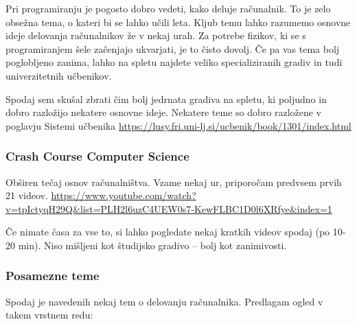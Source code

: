 \documentclass[
]{report}
\begin{document}
Pri programiranju je pogosto dobro vedeti, kako deluje računalnik. To je zelo obsežna tema, o kateri bi se lahko učili leta. Kljub temu lahko razumemo osnovne ideje delovanja računalnikov že v nekaj urah. Za potrebe fizikov, ki se s programiranjem šele začenjajo ukvarjati, je to čisto dovolj. Če pa vas tema bolj poglobljeno zanima, lahko na spletu najdete veliko specializiranih gradiv in tudi univerzitetnih učbenikov.

Spodaj sem skušal zbrati čim bolj jedrnata gradiva na spletu, ki poljudno in dobro razložijo nekatere osnovne ideje. Nekatere teme so dobro razložene v poglavju Sistemi učbenika \url{https://lusy.fri.uni-lj.si/ucbenik/book/1301/index.html}

\hypertarget{crash-course-computer-science}{%
\subsubsection*{Crash Course Computer Science}\label{crash-course-computer-science}}

Obširen tečaj osnov računalništva. Vzame nekaj ur, priporočam predvsem prvih 21 videov. \url{https://www.youtube.com/watch?v=tpIctyqH29Q\&list=PLH2l6uzC4UEW0s7-KewFLBC1D0l6XRfye\&index=1}

Če nimate časa za vse to, si lahko pogledate nekaj kratkih videov spodaj (po 10-20 min). Niso mišljeni kot študijsko gradivo -- bolj kot zanimivosti.

\hypertarget{posamezne-teme}{%
\subsubsection*{Posamezne teme}\label{posamezne-teme}}

Spodaj je navedenih nekaj tem o delovanju računalnika. Predlagam ogled v takem vrstnem redu:
\end{document}
